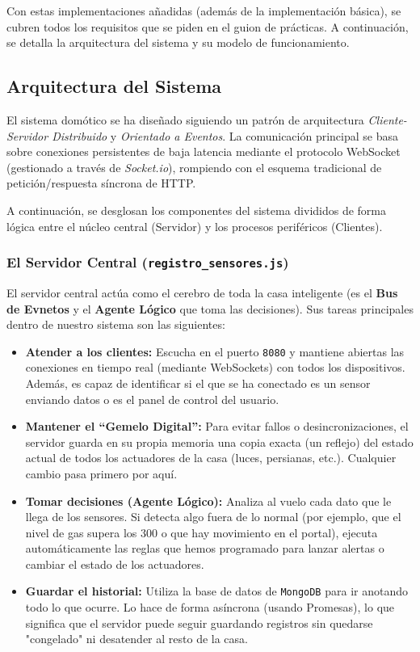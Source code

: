 \documentclass[a4paper,12pt]{article}
\begin{document}
			Con estas implementaciones añadidas (además de la implementación básica), se cubren todos los requisitos que se piden en el guion de prácticas. A continuación, se detalla la arquitectura del sistema y su modelo de funcionamiento.
			
		\subsection{Arquitectura del Sistema}
		
			El sistema domótico se ha diseñado siguiendo un patrón de arquitectura \textit{Cliente-Servidor Distribuido} y \textit{Orientado a Eventos}. La comunicación principal se basa sobre conexiones persistentes de baja latencia mediante el protocolo WebSocket (gestionado a través de \textit{Socket.io}), rompiendo con el esquema tradicional de petición/respuesta síncrona de HTTP. 
			
			A continuación, se desglosan los componentes del sistema divididos de forma lógica entre el núcleo central (Servidor) y los procesos periféricos (Clientes).
			
			\subsubsection{El Servidor Central (\texttt{registro\_sensores.js})}
				El servidor central  actúa como el cerebro de toda la casa inteligente (es el \textbf{Bus de Evnetos} y el \textbf{Agente Lógico} que toma las decisiones). Sus tareas principales dentro de nuestro sistema son las siguientes:
				
				\begin{itemize}
					\item \textbf{Atender a los clientes:} Escucha en el puerto \texttt{8080} y mantiene abiertas las conexiones en tiempo real (mediante WebSockets) con todos los dispositivos. Además, es capaz de identificar si el que se ha conectado es un sensor enviando datos o es el panel de control del usuario.
					
					\item \textbf{Mantener el ``Gemelo Digital'':} Para evitar fallos o desincronizaciones, el servidor guarda en su propia memoria una copia exacta (un reflejo) del estado actual de todos los actuadores de la casa (luces, persianas, etc.). Cualquier cambio pasa primero por aquí.
					
					\item \textbf{Tomar decisiones (Agente Lógico):} Analiza al vuelo cada dato que le llega de los sensores. Si detecta algo fuera de lo normal (por ejemplo, que el nivel de gas supera los 300 o que hay movimiento en el portal), ejecuta automáticamente las reglas que hemos programado para lanzar alertas o cambiar el estado de los actuadores.
					
					\item \textbf{Guardar el historial:} Utiliza la base de datos de \texttt{MongoDB} para ir anotando todo lo que ocurre. Lo hace de forma asíncrona (usando Promesas), lo que significa que el servidor puede seguir guardando registros sin quedarse "congelado" ni desatender al resto de la casa.
				\end{itemize}
				
\end{document}
